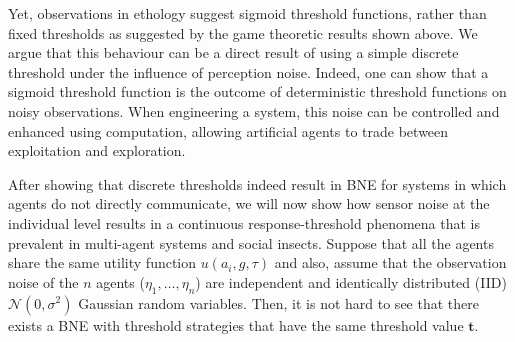 \documentclass{nature}
\def\td{\mathbf{t}}   %
\begin{document}
Yet, observations in ethology suggest sigmoid threshold functions\cite{Bonabeau1996}, rather than fixed thresholds as suggested by the game theoretic results shown above. We argue that this behaviour can be a direct result of using a simple discrete threshold under the influence of perception noise. Indeed, one can show that a sigmoid threshold function is the outcome of deterministic threshold functions on noisy observations. When engineering a system, this noise can be controlled and enhanced using computation, allowing artificial agents to trade between exploitation and exploration. 

After showing that discrete thresholds indeed result in BNE for systems in which agents do not directly communicate, we will now show how sensor noise at the individual level results in a continuous response-threshold phenomena that is prevalent in multi-agent systems and social insects. Suppose that all the agents share the same utility function $u(a_i,g,\tau)$ and also, assume that the observation noise of the $n$ agents ($\eta_1,\ldots,\eta_n$) are independent and identically distributed (IID) $\mathcal{N}(0,\sigma^2)$ Gaussian random variables. Then, it is not hard to see that there exists a BNE with threshold strategies that have the same threshold value $\td$\cite{Morris2000}.
\end{document}
